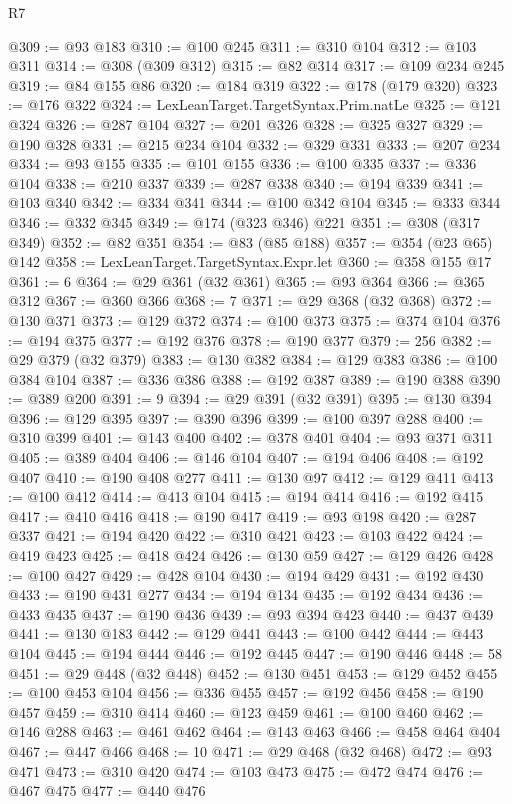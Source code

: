 \begin{lexlean}{R7}
\begin{coremodule}
@309 := @93 @183
@310 := @100 @245
@311 := @310 @104
@312 := @103 @311
@314 := @308 (@309 @312)
@315 := @82 @314
@317 := @109 @234 @245
@319 := @84 @155 @86
@320 := @184 @319
@322 := @178 (@179 @320)
@323 := @176 @322
@324 := LexLeanTarget.TargetSyntax.Prim.natLe
@325 := @121 @324
@326 := @287 @104
@327 := @201 @326
@328 := @325 @327
@329 := @190 @328
@331 := @215 @234 @104
@332 := @329 @331
@333 := @207 @234
@334 := @93 @155
@335 := @101 @155
@336 := @100 @335
@337 := @336 @104
@338 := @210 @337
@339 := @287 @338
@340 := @194 @339
@341 := @103 @340
@342 := @334 @341
@344 := @100 @342 @104
@345 := @333 @344
@346 := @332 @345
@349 := @174 (@323 @346) @221
@351 := @308 (@317 @349)
@352 := @82 @351
@354 := @83 (@85 @188)
@357 := @354 (@23 @65) @142
@358 := LexLeanTarget.TargetSyntax.Expr.let
@360 := @358 @155 @17
@361 := 6
@364 := @29 @361 (@32 @361)
@365 := @93 @364
@366 := @365 @312
@367 := @360 @366
@368 := 7
@371 := @29 @368 (@32 @368)
@372 := @130 @371
@373 := @129 @372
@374 := @100 @373
@375 := @374 @104
@376 := @194 @375
@377 := @192 @376
@378 := @190 @377
@379 := 256
@382 := @29 @379 (@32 @379)
@383 := @130 @382
@384 := @129 @383
@386 := @100 @384 @104
@387 := @336 @386
@388 := @192 @387
@389 := @190 @388
@390 := @389 @200
@391 := 9
@394 := @29 @391 (@32 @391)
@395 := @130 @394
@396 := @129 @395
@397 := @390 @396
@399 := @100 @397 @288
@400 := @310 @399
@401 := @143 @400
@402 := @378 @401
@404 := @93 @371 @311
@405 := @389 @404
@406 := @146 @104
@407 := @194 @406
@408 := @192 @407
@410 := @190 @408 @277
@411 := @130 @97
@412 := @129 @411
@413 := @100 @412
@414 := @413 @104
@415 := @194 @414
@416 := @192 @415
@417 := @410 @416
@418 := @190 @417
@419 := @93 @198
@420 := @287 @337
@421 := @194 @420
@422 := @310 @421
@423 := @103 @422
@424 := @419 @423
@425 := @418 @424
@426 := @130 @59
@427 := @129 @426
@428 := @100 @427
@429 := @428 @104
@430 := @194 @429
@431 := @192 @430
@433 := @190 @431 @277
@434 := @194 @134
@435 := @192 @434
@436 := @433 @435
@437 := @190 @436
@439 := @93 @394 @423
@440 := @437 @439
@441 := @130 @183
@442 := @129 @441
@443 := @100 @442
@444 := @443 @104
@445 := @194 @444
@446 := @192 @445
@447 := @190 @446
@448 := 58
@451 := @29 @448 (@32 @448)
@452 := @130 @451
@453 := @129 @452
@455 := @100 @453 @104
@456 := @336 @455
@457 := @192 @456
@458 := @190 @457
@459 := @310 @414
@460 := @123 @459
@461 := @100 @460
@462 := @146 @288
@463 := @461 @462
@464 := @143 @463
@466 := @458 @464 @404
@467 := @447 @466
@468 := 10
@471 := @29 @468 (@32 @468)
@472 := @93 @471
@473 := @310 @420
@474 := @103 @473
@475 := @472 @474
@476 := @467 @475
@477 := @440 @476

\end{coremodule}
\end{lexlean}
